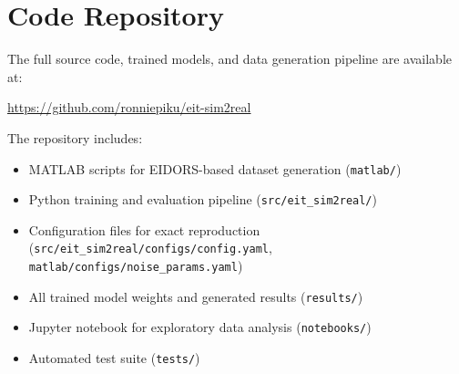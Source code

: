 \section{Code Repository}
\label{app:code}

The full source code, trained models, and data generation pipeline are available at:

\begin{center}
\url{https://github.com/ronniepiku/eit-sim2real}
\end{center}

\noindent The repository includes:
\begin{itemize}
    \item MATLAB scripts for EIDORS-based dataset generation (\texttt{matlab/})
    \item Python training and evaluation pipeline (\texttt{src/eit\_sim2real/})
    \item Configuration files for exact reproduction (\texttt{src/eit\_sim2real/configs/config.yaml}, \texttt{matlab/configs/noise\_params.yaml})
    \item All trained model weights and generated results (\texttt{results/})
    \item Jupyter notebook for exploratory data analysis (\texttt{notebooks/})
    \item Automated test suite (\texttt{tests/})
\end{itemize}
